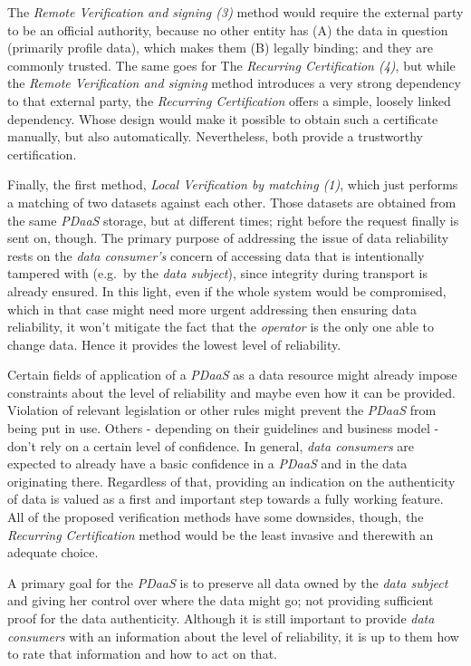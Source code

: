 \documentclass[12pt,english,a4paper,titlepage,cleardoublepage=empty,dottedtoc]{report}
\begin{document}
The \emph{Remote Verification and signing (3)} method would require the
external party to be an official authority, because no other entity has
(A) the data in question (primarily profile data), which makes them (B)
legally binding; and they are commonly trusted. The same goes for The
\emph{Recurring Certification (4)}, but while the \emph{Remote
Verification and signing} method introduces a very strong dependency to
that external party, the \emph{Recurring Certification} offers a simple,
loosely linked dependency. Whose design would make it possible to obtain
such a certificate manually, but also automatically. Nevertheless, both
provide a trustworthy certification.

Finally, the first method, \emph{Local Verification by matching (1)},
which just performs a matching of two datasets against each other. Those
datasets are obtained from the same \emph{PDaaS} storage, but at
different times; right before the request finally is sent on, though.
The primary purpose of addressing the issue of data reliability rests on
the \emph{data consumer's} concern of accessing data that is
intentionally tampered with (e.g.~by the \emph{data subject}), since
integrity during transport is already ensured. In this light, even if
the whole system would be compromised, which in that case might need
more urgent addressing then ensuring data reliability, it won't mitigate
the fact that the \emph{operator} is the only one able to change data.
Hence it provides the lowest level of reliability.

Certain fields of application of a \emph{PDaaS} as a data resource might
already impose constraints about the level of reliability and maybe even
how it can be provided. Violation of relevant legislation or other rules
might prevent the \emph{PDaaS} from being put in use. Others - depending
on their guidelines and business model - don't rely on a certain level
of confidence. In general, \emph{data consumers} are expected to already
have a basic confidence in a \emph{PDaaS} and in the data originating
there. Regardless of that, providing an indication on the authenticity
of data is valued as a first and important step towards a fully working
feature. All of the proposed verification methods have some downsides,
though, the \emph{Recurring Certification} method would be the least
invasive and therewith an adequate choice.

A primary goal for the \emph{PDaaS} is to preserve all data owned by the
\emph{data subject} and giving her control over where the data might go;
not providing sufficient proof for the data authenticity. Although it is
still important to provide \emph{data consumers} with an information
about the level of reliability, it is up to them how to rate that
information and how to act on that.
\end{document}
